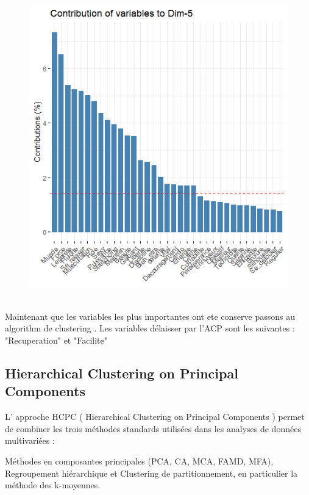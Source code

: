 \documentclass[12pt]{article}
\begin{document}
\begin{figure}[H]
\begin{center}
\includegraphics[scale=1.3]{ACP_6.png} 
\caption[]{\ }
\end{center}
\end{figure}


Maintenant que les variables les plus importantes ont ete conserve passons au algorithm de  clustering . Les variables délaisser par l'ACP sont les suivantes : "Recuperation" et  "Facilite"



\newpage   


\subsection{Hierarchical Clustering on Principal Components }  
L' approche HCPC ( Hierarchical Clustering on Principal Components ) permet de combiner les trois méthodes standards utilisées dans les analyses de données multivariées :

Méthodes en composantes principales (PCA, CA, MCA, FAMD, MFA),
Regroupement hiérarchique et
Clustering de partitionnement, en particulier la méthode des k-moyennes.
\end{document}
